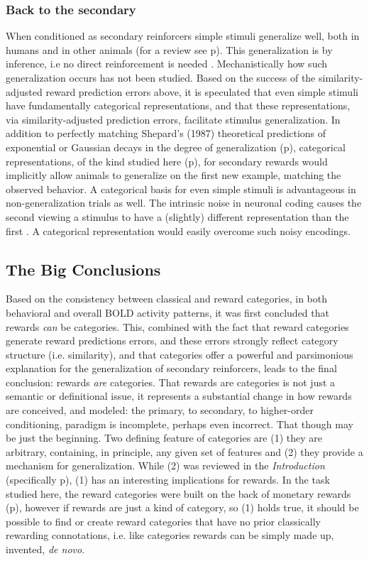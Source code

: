 \subsubsection{Back to the secondary}
\label{sub:generalsense}
When conditioned as secondary reinforcers simple stimuli generalize well, both in humans and in other animals (for a review see p\pageref{subsub:birds}).  This generalization is by inference, i.e no direct reinforcement is needed \citep{Guttman:1956p8355,Nakamura:2006p9093,Smith:2011p9101}.  Mechanistically how such generalization occurs has not been studied.  Based on the success of the similarity-adjusted reward prediction errors above, it is speculated that even simple stimuli have fundamentally categorical representations, and that these representations, via similarity-adjusted prediction errors, facilitate stimulus generalization.  In addition to perfectly matching Shepard's (1987) theoretical predictions of exponential or Gaussian decays in the degree of generalization (p\pageref{subsub:curves}), categorical representations, of the kind studied here (p\pageref{subsub:catquant}), for secondary rewards would implicitly allow animals to generalize on the first new example, matching the observed behavior.  A categorical basis for even simple stimuli is advantageous in non-generalization trials as well. The intrinsic noise in neuronal coding causes the second viewing a stimulus to have a (slightly) different representation than the first \citep{Ashby:1986p9783}.  A categorical representation would easily overcome such noisy encodings. 

\subsection{The Big Conclusions}
Based on the consistency between classical and reward categories, in both behavioral and overall BOLD activity patterns, it was first concluded that rewards \emph{can} be categories.  This, combined with the fact that reward categories generate reward predictions errors, and these errors strongly reflect category structure (i.e. similarity), and that categories offer a powerful and parsimonious explanation for the generalization of secondary reinforcers, leads to the final conclusion: rewards \emph{are} categories.
That rewards are categories is not just a semantic or definitional issue, it represents a substantial change in how rewards are conceived, and modeled: the primary, to secondary, to higher-order conditioning, paradigm is incomplete, perhaps even incorrect.  That though may be just the beginning.  Two defining feature of categories are (1) they are arbitrary, containing, in principle, any given set of features and (2) they provide a mechanism for generalization.  While (2) was reviewed in the \emph{Introduction} (specifically p\pageref{sub:gen}), (1) has an interesting implications for rewards.  In the task studied here, the reward categories were built on the back of monetary rewards (p\pageref{subsub:whatwhen}), however if rewards are just a kind of category, so (1) holds true, it should be possible to find or create reward categories that have no prior classically rewarding connotations, i.e. like categories rewards can be simply made up, invented, \emph{de novo}.

